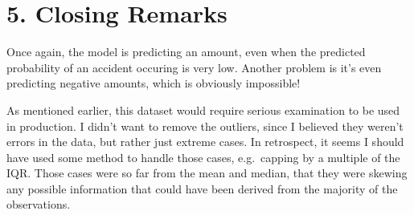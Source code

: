 \documentclass[]{article}
\begin{document}
\section{5. Closing Remarks}\label{closing-remarks}

Once again, the model is predicting an amount, even when the predicted
probability of an accident occuring is very low. Another problem is it's
even predicting negative amounts, which is obviously impossible!

As mentioned earlier, this dataset would require serious examination to
be used in production. I didn't want to remove the outliers, since I
believed they weren't errors in the data, but rather just extreme cases.
In retrospect, it seems I should have used some method to handle those
cases, e.g.~capping by a multiple of the IQR. Those cases were so far
from the mean and median, that they were skewing any possible
information that could have been derived from the majority of the
observations.
\end{document}
